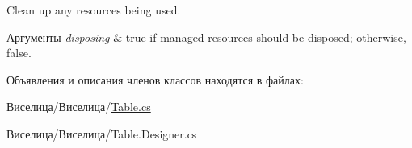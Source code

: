 Clean up any resources being used. 


\begin{DoxyParams}{Аргументы}
{\em disposing} & true if managed resources should be disposed; otherwise, false.\\
\hline
\end{DoxyParams}


Объявления и описания членов классов находятся в файлах\+:\begin{DoxyCompactItemize}
\item 
Виселица/Виселица/\hyperlink{_table_8cs}{Table.\+cs}\item 
Виселица/Виселица/Table.\+Designer.\+cs\end{DoxyCompactItemize}
